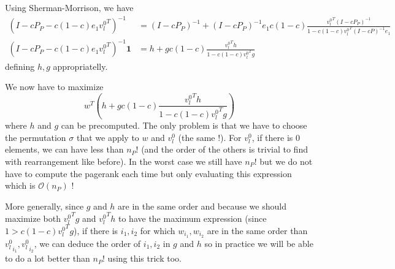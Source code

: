 \documentclass{article}
\newcommand{\bigoh}{\mathcal{O}}
\newcommand{\1}{\mathbf{1}}
\theoremstyle{definition}
\begin{document}
Using Sherman-Morrison, we have
\begin{align*}
  (I - cP_P - c (1-c) e_1 {v_l^0}^T)^{-1} & = (I - cP_P)^{-1} + (I - cP_P)^{-1}e_1 c(1-c) \frac{{v_l^0}^T(I-cP_P)^{-1}}{1 - c(1-c){v_l^0}^T(I-cP)^{-1}e_1}\\
  (I - cP_P - c (1-c) e_1 {v_l^0}^T)^{-1}\1 & = h + g c(1-c) \frac{{v_l^0}^Th}{1 - c(1-c){v_l^0}^Tg}
\end{align*}
defining $h,g$ appropriatelly.

We now have to maximize
\[ w^T \left(h + g c(1-c) \frac{{v_l^0}^Th}{1 - c(1-c){v_l^0}^Tg}\right) \]
where $h$ and $g$ can be precomputed.
The only problem is that we have to choose the permutation $\sigma$ that we apply to $w$ and $v_l^0$ (the same !).
For $v_l^0$, if there is 0 elements, we can have less than $n_P!$ (and the order of the others is trivial to find with rearrangement like before).
In the worst case we still have $n_P!$ but we do not have to compute the pagerank each time but only evaluating this expression which is $\bigoh(n_P)$ !

More generally, since $g$ and $h$ are in the same order  and because we should maximize both ${v_l^0}^Tg$ and ${v_l^0}^Th$ to have the maximum expression (since $1 > c(1-c){v_l^0}^Tg$),
if there is $i_1, i_2$ for which $w_{i_1}, w_{i_2}$ are in the same order than ${v_l^0}_{i_1}, {v_l^0}_{i_2}$,
we can deduce the order of $i_1, i_2$ in $g$ and $h$ so in practice we will be able to do a lot better than $n_P!$ using this trick too.



\end{document}
